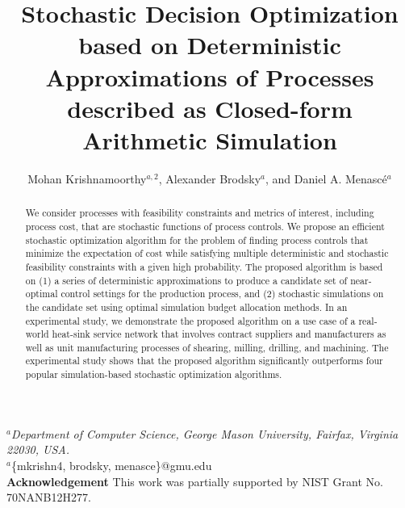 \documentclass[a4paper, 12pt]{article} %
\title{\textbf{Stochastic Decision Optimization based on Deterministic Approximations of Processes described as Closed-form Arithmetic Simulation }} %
\author{Mohan Krishnamoorthy$^{a,2}$, Alexander Brodsky$^a$, and Daniel A. Menasc\'e$^{a}$} %
\makeatletter
\newcommand\mycomment[1]{\textcolor{red}{\textbf{\textit{(#1)}}}}
\renewcommand{\maketitle}{ %
\begin{flushleft} 
{\large\@title\footnotemark[1]} %

\vspace{20pt} %

{\large\@author} %
\end{flushleft}
}
\makeatother
\begin{document}
\pagestyle{empty}
\maketitle %

\begin{flushleft} 
\vspace{10pt}
$^a$\textit{Department of Computer Science, George Mason University, Fairfax, Virginia 22030, USA.
}\\
\vspace{20pt}
$^a$\{mkrishn4, brodsky, menasce\}@gmu.edu \\
\vspace{20pt}
\textbf{Acknowledgement}\newline
This work was partially supported by NIST Grant No. 70NANB12H277. \newline
\vspace{20pt}
\footnotetext[1]{Word Count: 6319 \mycomment{to update}}
\end{flushleft} 

\newpage
\pagestyle{plain}
\setcounter{page}{1}
\noindent{\large \@title }
\vspace{10pt}


\begin{abstract}{\small\noindent
We consider processes with feasibility constraints and metrics of interest, including process cost, that are stochastic functions of process controls. We propose an efficient stochastic optimization algorithm for the problem of finding process controls that minimize the expectation of cost while satisfying multiple deterministic and stochastic feasibility constraints with a given high probability. The proposed algorithm is based on (1) a series of deterministic approximations to produce a candidate set of near-optimal control settings for the production process, and (2) stochastic simulations on the candidate set using optimal simulation budget allocation methods. In an experimental study, we demonstrate the proposed algorithm on a use case of a real-world heat-sink service network that involves contract suppliers and manufacturers as well as unit manufacturing processes of shearing, milling, drilling, and machining. The experimental study shows that the proposed algorithm significantly outperforms four popular simulation-based stochastic optimization algorithms.
}
\end{abstract}
\end{document}
